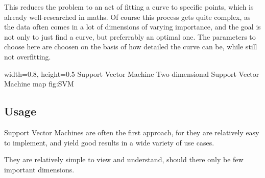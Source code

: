This reduces the problem to an act of fitting a curve to specific points, which is already well-researched in maths. Of course this process gets quite complex, as the data often comes in a lot of dimensions of varying importance, and the goal is not only to just find a curve, but preferrably an optimal one. The parameters to choose here are choosen on the basis of how detailed the curve can be, while still not overfitting.

    {width=0.8\textwidth, height=0.5\textheight} %
    {Support Vector Machine}   %
    {Two dimensional Support Vector Machine map}   %
    {fig:SVM}    %

\subsection{Usage}
Support Vector Machines are often the first approach, for they are relatively easy to implement, and yield good results in a wide variety of use cases. 

They are relatively simple to view and understand, should there only be few important dimensions.

